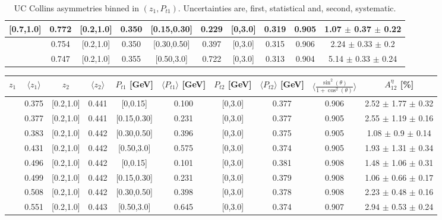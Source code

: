 \begin{table}[H]
\begin{tabular}{|c| c| c| c| c| c| c| c| c| c|}
[0.7,1.0]	&	0.772	&	[0.2,1.0]	&	0.350	&	[0.15,0.30]	&	0.229	&	[0,3.0]	&	0.319	&	0.905	& 1.07  $\pm$ 0.37  $\pm$ 0.22  	\\ \hline
[0.7,1.0]	&	0.754	&	[0.2,1.0]	&	0.350	&	[0.30,0.50]	&	0.397	&	[0,3.0]	&	0.315	&	0.906	& 2.24  $\pm$ 0.33  $\pm$ 0.2   	\\ \hline
[0.7,1.0]	&	0.747	&	[0.2,1.0]	&	0.355	&	[0.50,3.0]	&	0.722	&	[0,3.0]	&	0.313	&	0.904	& 5.14  $\pm$ 0.33  $\pm$ 0.24  	\\ \hline
\end{tabular}
\caption[UC Collins asymmetries binned in $(z_{1},P_{t1})$]{UC Collins asymmetries binned in $(z_{1},P_{t1})$. Uncertainties are, first, statistical and, second, systematic.}\label{tab:finalucptbins}
\end{table}

\begin{table}[H]\tiny
\centering
\begin{tabular}{|c| c| c| c| c| c| c| c| c| c|}
\hline
$z_1$& $\langle  z_{1}  \rangle$ & $z_2$ & $\langle  z_{2}\rangle$& $P_{t1}$ [GeV] & $\langle  P_{t1} \rangle$ [GeV] & $P_{t2}$ [GeV] &  $\langle P_{t2}\rangle$ [GeV]  &$\langle\frac{\sin^2(\theta)}{1+\cos^2(\theta)}\rangle$& $A_{12}^{\eta}$ [\%]   \\ \hline
[0.3,0.5]	&	0.375	&	[0.2,1.0]	&	0.441	&	[0,0.15]	&	0.100	&	[0,3.0]	&	0.377	&	0.906	&  2.52  $\pm$ 1.77  $\pm$ 0.32     \\ \hline
[0.3,0.5]	&	0.377	&	[0.2,1.0]	&	0.441	&	[0.15,0.30]	&	0.231	&	[0,3.0]	&	0.377	&	0.905	&  2.55  $\pm$ 1.19  $\pm$ 0.16     \\ \hline
[0.3,0.5]	&	0.383	&	[0.2,1.0]	&	0.442	&	[0.30,0.50]	&	0.396	&	[0,3.0]	&	0.375	&	0.905	&  1.08  $\pm$ 0.9  $\pm$ 0.14      \\ \hline
[0.3,0.5]	&	0.431	&	[0.2,1.0]	&	0.442	&	[0.50,3.0]	&	0.575	&	[0,3.0]	&	0.374	&	0.905	&  1.93  $\pm$ 1.31  $\pm$ 0.34     \\ \hline
\hline
[0.5,0.7]	&	0.496	&	[0.2,1.0]	&	0.442	&	[0,0.15]	&	0.101	&	[0,3.0]	&	0.381	&	0.908	&  1.48  $\pm$ 1.06  $\pm$ 0.31     \\ \hline
[0.5,0.7]	&	0.499	&	[0.2,1.0]	&	0.442	&	[0.15,0.30]	&	0.231	&	[0,3.0]	&	0.379	&	0.908	&  1.06  $\pm$ 0.66  $\pm$ 0.17     \\ \hline
[0.5,0.7]	&	0.508	&	[0.2,1.0]	&	0.442	&	[0.30,0.50]	&	0.398	&	[0,3.0]	&	0.378	&	0.908	&  2.23  $\pm$ 0.48  $\pm$ 0.16     \\ \hline
[0.5,0.7]	&	0.551	&	[0.2,1.0]	&	0.443	&	[0.50,3.0]	&	0.645	&	[0,3.0]	&	0.374	&	0.907	&  2.94  $\pm$ 0.53  $\pm$ 0.24     \\ \hline

\end{tabular}
\end{table}
